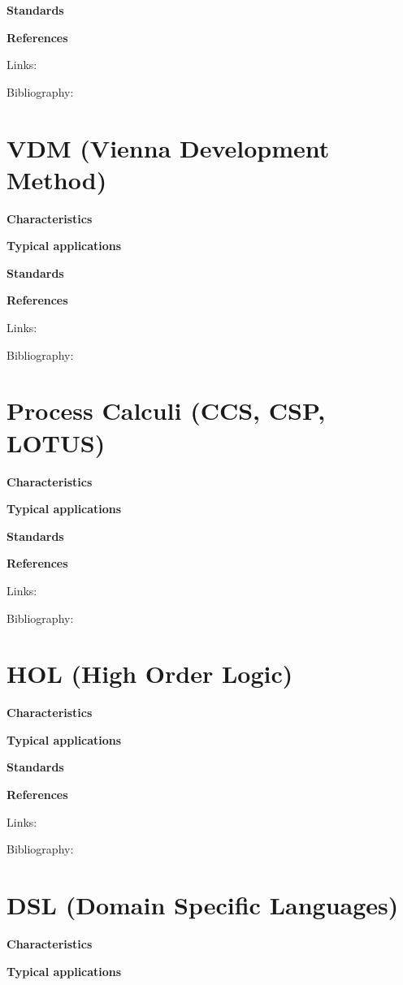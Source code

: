 \documentclass{./template/openetcs_report}
\begin{document}
	\textbf{Standards}


	\textbf{References}

Links:



Bibliography:

\section{VDM (Vienna Development Method)}


	\textbf{Characteristics}


	\textbf{Typical applications}


	\textbf{Standards}


	\textbf{References}

Links:



Bibliography:

\section{Process Calculi (CCS, CSP, LOTUS) }


	\textbf{Characteristics}


	\textbf{Typical applications}


	\textbf{Standards}


	\textbf{References}

Links:



Bibliography:

\section{HOL (High Order Logic)}


	\textbf{Characteristics}


	\textbf{Typical applications}


	\textbf{Standards}


	\textbf{References}

Links:



Bibliography:

\section{DSL (Domain Specific Languages)}


	\textbf{Characteristics}


	\textbf{Typical applications}
\end{document}
